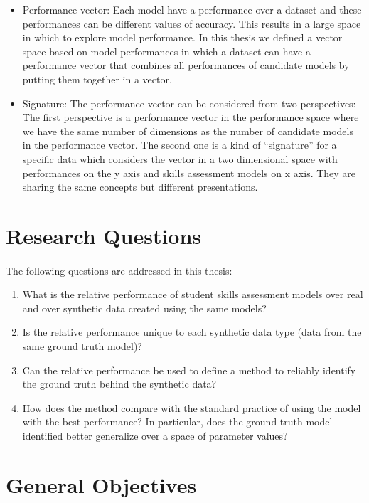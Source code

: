 \begin{itemize}
\item Performance vector: Each model have a performance over a dataset and these performances can be different values of accuracy. This results in a large space in which to explore model performance. In this thesis we defined a vector space based on model performances in which a dataset can have a performance vector that combines all performances of candidate models by putting them together in a vector.
\item Signature: The performance vector can be considered from two perspectives: The first perspective is a performance vector in the performance space where we have the same number of dimensions as the number of candidate models in the performance vector. The second one is a kind of ``signature'' for a specific data which considers the vector in a two dimensional space with performances on the y axis and skills assessment models on x axis.  They are sharing the same concepts but different presentations. 




\end{itemize}

\section{Research Questions}
\paragraph{}The following questions are addressed in this thesis:

\begin{enumerate}
\item What is the relative performance of student skills assessment models over real and over synthetic data created using the same models?
\item Is the relative performance unique to each synthetic data type (data from the same ground truth model)?
\item Can the relative performance be used to define a method to reliably identify the ground truth behind the synthetic data?
\item How does the method compare with the standard practice of using the model with the best performance?  In particular, does the ground truth model identified better generalize over a space of parameter values?
\end{enumerate}


\section{General Objectives}

